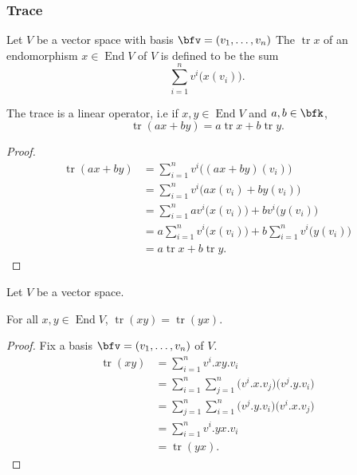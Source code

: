 \documentclass{article}
\DeclareMathOperator{\End}{End}
\DeclareMathOperator{\tr}{tr}
\newcommand*\acts{.}
\begin{document}
\subsubsection{Trace}

\begin{definition}
    Let $V$ be a vector space with basis $\bfv = (v_1,\ldots,v_n)$
    The  $\tr x$ of an endomorphism $x \in \End V$ of $V$ is defined to be the sum
    \[
        \sum_{i=1}^n 
        v^i\Big(x(v_i)\Big).
    \]
\end{definition}

\begin{theorem}
    The trace is a linear operator, i.e if $x, y \in \End V$ and $a,b \in \bfk$,
    \[
        \tr(ax + by)
        =
        a\tr x + b \tr y.
    \]
\end{theorem}
\begin{proof}
    \begin{align*}
        \tr (ax + by)
        &=
        \sum_{i=1}^n 
        v^i\Big((ax + by)(v_i)\Big)
        \\
        &=
        \sum_{i=1}^n 
        v^i\Big(ax(v_i) + by(v_i)\Big)
        \\
        &=
        \sum_{i=1}^n 
        av^i\Big(x(v_i)\Big)
        + bv^i\Big(y(v_i)\Big)
        \\
        &=
        a
        \sum_{i=1}^n 
        v^i\Big(x(v_i)\Big)
        + 
        b
        \sum_{i=1}^n 
        v^i\Big(y(v_i)\Big)
        \\
        &=
        a \tr x + b \tr y.
    \end{align*}
\end{proof}

\begin{theorem}
    Let $V$ be a vector space.

    For all $x, y \in \End V$, $\tr(xy) = \tr(yx)$.
\end{theorem}

\begin{proof}
    Fix a basis $\bfv = (v_1, \ldots, v_n)$ of $V$.
    \begin{align*}
        \tr (xy)
        &=
        \sum_{i=1}^n 
        v^i \acts xy \acts v_i
        \\
        &=
        \sum_{i=1}^n 
        \sum_{j=1}^n
        \Big(
            v^i \acts x \acts v_j
        \Big) 
        \Big(
            v^j \acts y \acts v_i
        \Big)
        \\
        &=
        \sum_{j=1}^n
        \sum_{i=1}^n 
        \Big(
            v^j \acts y \acts v_i
        \Big)
        \Big(
            v^i \acts x \acts v_j
        \Big) 
        \\
        &=
        \sum_{i=1}^n 
        v^i \acts yx \acts v_i
        \\
        &=
        \tr (yx).
    \end{align*}
\end{proof}
\end{document}
